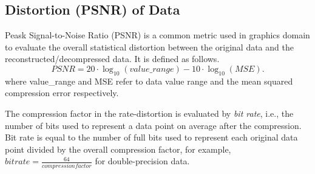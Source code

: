 \subsection{Distortion (PSNR) of Data}

Peask Signal-to-Noise Ratio (PSNR) is a common metric used in graphics domain to evaluate the overall statistical distortion between the original data and the reconstructed/decompressed data. It is defined as follows. 
\begin{equation}
PSNR = 20\cdot \log_{10}{(value\_range)} - 10\cdot \log_{10}{(MSE)}. 
\end{equation}  
where value\_range and MSE refer to data value range and the mean squared compression error respectively.

The compression factor in the rate-distortion is evaluated by \emph{bit rate}, i.e., the number of bits used to represent a data point on average after the compression. Bit rate is equal to the number of full bits used to represent each original data point divided by the overall compression factor, for example, $bit rate = \frac{64}{compression factor}$ for double-precision data.

